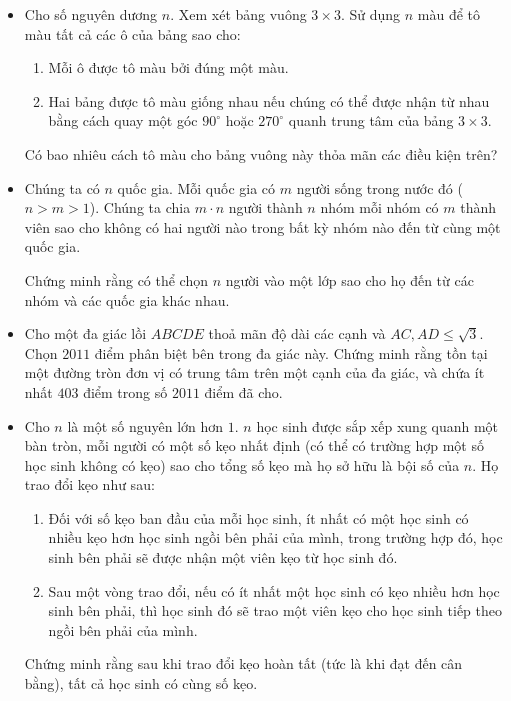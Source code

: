 \documentclass[11pt]{scrartcl}
\begin{document}
\begin{itemize}[label=, leftmargin=0em, itemsep=0.5em]
    \item \begin{btvn}
        Cho số nguyên dương $n$. Xem xét bảng vuông $3 \times 3$. Sử dụng $n$ màu để tô màu tất cả các ô của bảng sao cho:
        \begin{enumerate}
            \item Mỗi ô được tô màu bởi đúng một màu.
            \item Hai bảng được tô màu giống nhau nếu chúng có thể được nhận từ nhau bằng cách quay một góc $90^\circ$ hoặc $270^\circ$ quanh trung tâm của bảng $3 \times 3$.
        \end{enumerate}
    Có bao nhiêu cách tô màu cho bảng vuông này thỏa mãn các điều kiện trên?
    \end{btvn}

    \item \begin{btvn}
        Chúng ta có $n$ quốc gia. Mỗi quốc gia có $m$ người sống trong nước đó ($n>m>1$). Chúng ta chia $m \cdot n$ người thành $n$ nhóm mỗi nhóm có $m$ thành viên sao cho không có hai người nào trong bất kỳ nhóm nào đến từ cùng một quốc gia.


        Chứng minh rằng có thể chọn $n$ người vào một lớp sao cho họ đến từ các nhóm và các quốc gia khác nhau.
    \end{btvn}

    \item \begin{btvn}
        Cho một đa giác lồi $ABCDE$ thoả mãn độ dài các cạnh và $AC, AD \leq \sqrt{3}.$ Chọn $2011$ điểm phân biệt bên trong đa giác này. Chứng minh rằng tồn tại một đường tròn đơn vị có trung tâm trên một cạnh của đa giác, và chứa ít nhất $403$ điểm trong số $2011$ điểm đã cho.

    \end{btvn}

    \item \begin{btvn}
        Cho $n$ là một số nguyên lớn hơn $1.$ $n$ học sinh được sắp xếp xung quanh một bàn tròn, mỗi người có một số kẹo nhất định (có thể có trường hợp một số học sinh không có kẹo) sao cho tổng số kẹo mà họ sở hữu là bội số của $n.$ Họ trao đổi kẹo như sau: 
        
        \begin{enumerate}
            \item Đối với số kẹo ban đầu của mỗi học sinh, ít nhất có một học sinh có nhiều kẹo hơn học sinh ngồi bên phải của mình, trong trường hợp đó, học sinh bên phải sẽ được nhận một viên kẹo từ học sinh đó.
            \item Sau một vòng trao đổi, nếu có ít nhất một học sinh có kẹo nhiều hơn học sinh bên phải, thì học sinh đó sẽ trao một viên kẹo cho học sinh tiếp theo ngồi bên phải của mình.
        \end{enumerate}  
        Chứng minh rằng sau khi trao đổi kẹo hoàn tất (tức là khi đạt đến cân bằng), tất cả học sinh có cùng số kẹo.
    \end{btvn}


\end{itemize}
\end{document}
